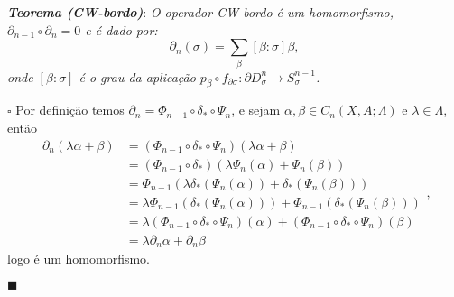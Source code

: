 \documentclass[12pt]{book}
\newcommand{\celulafront}[2]{\partial D^{#1}_{#2}}
\newcommand{\tese}[3]{\vspace{2mm} \textit{\textbf{#1}}: \textit{#2} \par $\square$ #3 \par $\blacksquare$}
\begin{document}
	\tese{Teorema (CW-bordo)}{O operador  CW-bordo é um homomorfismo, $\partial_{n-1}\circ\partial_{n} = 0$ e é dado por:
	$$
	\partial_{n}(\sigma) = \sum_{\beta}[\beta:\sigma]\beta,
	$$
	onde $[\beta:\sigma]$ é o grau da aplicação $p_{\beta} \circ f_{\partial\sigma}:\celulafront{n}{\sigma} \to S^{n-1}_{\sigma}$.}{Por definição temos $\partial_{n} = \Phi_{n-1} \circ \delta_{*} \circ \Psi_{n}$, e sejam $\alpha,\beta \in C_{n}(X,A; \Lambda)$ e $\lambda \in \Lambda$, então
	$$ 
	\begin{aligned}
	\partial_{n}(\lambda \alpha+\beta) &= (\Phi_{n-1} \circ \delta_{*} \circ \Psi_{n})(\lambda \alpha+\beta)
	\\
	&= (\Phi_{n-1} \circ \delta_{*}) (\lambda\Psi_{n}(\alpha) + \Psi_{n}(\beta))
	\\
	&= \Phi_{n-1}(\lambda\delta_{*}(\Psi_{n}(\alpha)) + \delta_{*}(\Psi_{n}(\beta)))
	\\
	&= \lambda \Phi_{n-1}(\delta_{*}(\Psi_{n}(\alpha))) + \Phi_{n-1}(\delta_{*}(\Psi_{n}(\beta)))
	\\
	&=\lambda (\Phi_{n-1}\circ\delta_{*} \circ\Psi_{n})(\alpha) + (\Phi_{n-1}\circ\delta_{*} \circ\Psi_{n})(\beta)
	\\
	&= \lambda\partial_{n}\alpha +\partial_{n}\beta
	\end{aligned},
	$$
	logo é um homomorfismo.
	
}
\end{document}
